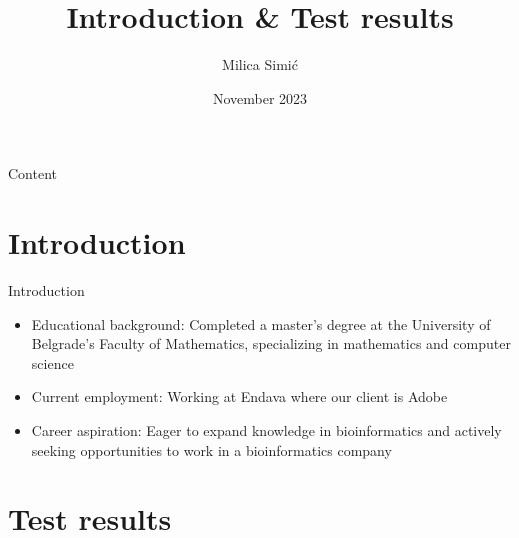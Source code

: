 \documentclass{beamer}
\title{Introduction \& Test results}
\author[Milica Simić]{Milica Simić}
\date{November 2023}
\begin{document}
\maketitle


\begin{frame}{Content}

\tableofcontents

\end{frame}
\section{Introduction}
\begin{frame}{Introduction}

\begin{itemize}
    \item<1-> Educational background: Completed a master’s degree at the University of Belgrade’s Faculty of Mathematics, specializing in mathematics and computer science
    \item<2-> Current employment: Working at Endava where our client is Adobe
    \item<3-> Career aspiration: Eager to expand knowledge in bioinformatics and actively seeking opportunities to work in a bioinformatics company
        
\end{itemize}

\end{frame}
\section{Test results}
\end{document}
